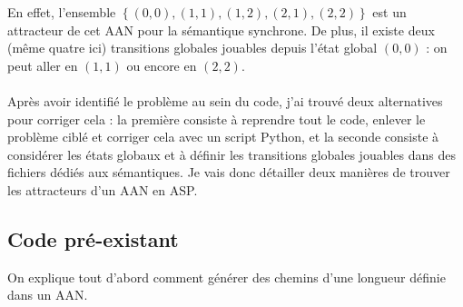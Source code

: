 \documentclass[12pt,a4paper]{article}
\begin{document}
En effet, l'ensemble $\left\{(0,0),(1,1),(1,2),(2,1),(2,2)\right\}$ est un attracteur de cet AAN pour la sémantique synchrone. De plus, il existe deux (même quatre ici) transitions globales jouables depuis l'état global $(0,0)$ : 
on peut aller en $(1,1)$ ou encore en $(2,2)$.\\ \\
Après avoir identifié le problème au sein du code, j'ai trouvé deux alternatives pour corriger cela : la première consiste à reprendre tout le code, enlever le problème ciblé et corriger cela avec un script Python, et la seconde 
consiste à considérer les états globaux et à définir les transitions globales jouables dans des fichiers dédiés aux sémantiques. Je vais donc détailler deux manières de trouver les attracteurs d'un AAN en ASP.

\subsection{Code pré-existant}
\hypertarget{preexistante}{On explique tout d'abord comment générer des chemins d'une longueur définie dans un AAN.}\\ \\
\end{document}
